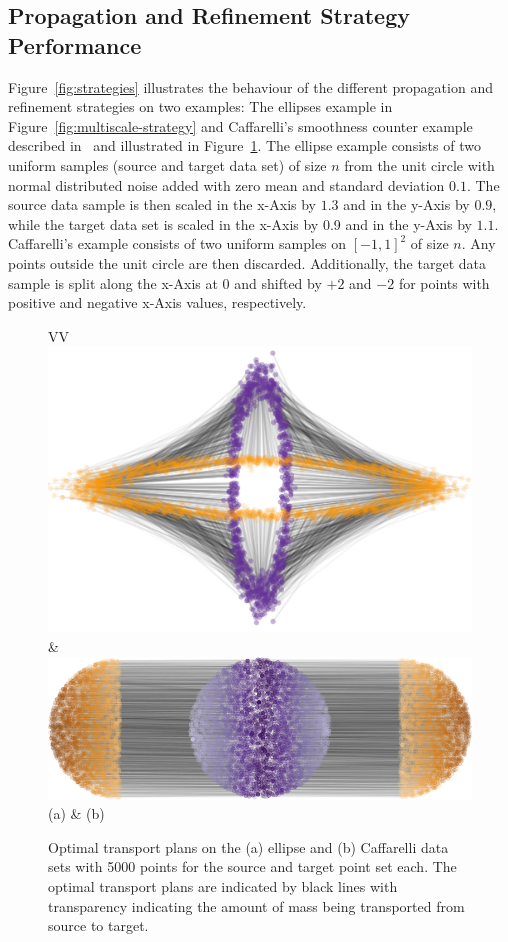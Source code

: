 \documentclass[twoside,11pt]{article}
\begin{document}
\subsection{Propagation and Refinement Strategy Performance}
Figure~\ref{fig:strategies} illustrates the behaviour of the different
propagation and refinement strategies on two examples: The ellipses example in
Figure~\ref{fig:multiscale-strategy} and Caffarelli's smoothness counter example
described in~\citet[Chapter~12]{villani:book2009} and illustrated in
Figure~\ref{fig:datasets}. The ellipse example consists of two uniform samples
(source and target data set) of size $n$ from the unit circle with normal
distributed noise added with zero mean and standard deviation $0.1$. The source
data sample is then scaled in the x-Axis by $1.3$ and in the y-Axis by $0.9$,
while the target data set is scaled in the x-Axis
by 0.9 and in the y-Axis by $1.1$. 
Caffarelli's example consists of two uniform samples on $[-1,1]^2$ of size $n$.
Any points outside the unit circle are then discarded. Additionally, the target
data sample is split along the x-Axis at $0$ and shifted by $+2$ and $-2$ for
points with positive and negative x-Axis values, respectively. 
\begin{figure}[htb]
\centering
\begin{tabular}{VV}
\includegraphics[width=0.9\linewidth]{scale-9} & 
\includegraphics[width=0.9\linewidth]{caffarelli-plan}\\
                      (a) & (b)  
\end{tabular}
\vspace{-0.2in}
\caption{
\label{fig:datasets}
Optimal transport plans on the (a) ellipse and (b) Caffarelli data sets with
5000 points for the source and target point set each. The optimal transport
plans are indicated by black lines with transparency indicating the amount of
mass being transported from source to target. } 
\end{figure}
\end{document}
